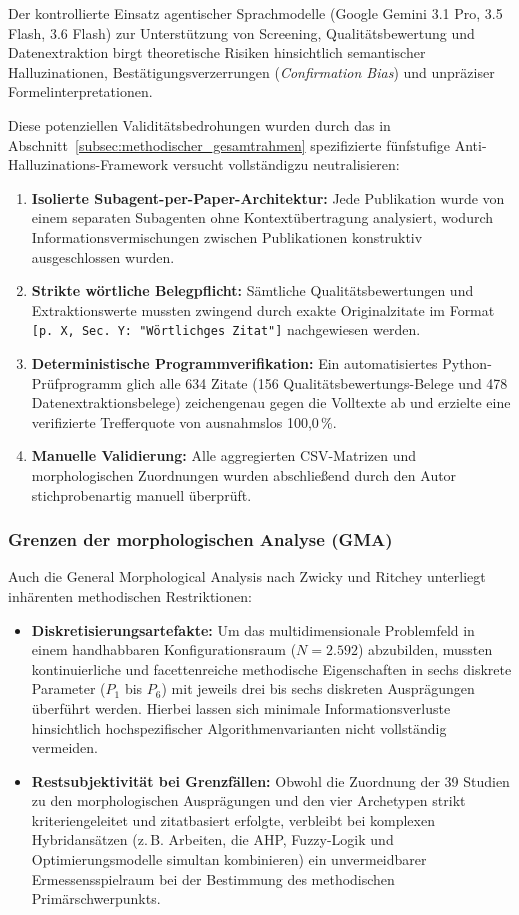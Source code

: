 Der kontrollierte Einsatz agentischer Sprachmodelle (Google Gemini 3.1 Pro, 3.5 Flash, 3.6 Flash) zur Unterstützung von Screening, Qualitätsbewertung und Datenextraktion birgt theoretische Risiken hinsichtlich semantischer Halluzinationen, Bestätigungs\-verzerrungen (\textit{Confirmation Bias}) und unpräziser Formelinterpretationen.

Diese potenziellen Validitätsbedrohungen wurden durch das in Abschnitt~\ref{subsec:methodischer_gesamtrahmen} spezifizierte fünfstufige Anti-Halluzinations-Framework versucht vollständigzu neutralisieren:
\begin{enumerate}[label=(\alph*), leftmargin=*]
  \item \textbf{Isolierte Subagent-per-Paper-Architektur:} Jede Publikation wurde von einem separaten Subagenten ohne Kontextübertragung analysiert, wodurch Informationsvermischungen zwischen Publikationen konstruktiv ausgeschlossen wurden.
  \item \textbf{Strikte wörtliche Belegpflicht:} Sämtliche Qualitätsbewertungen und Extraktionswerte mussten zwingend durch exakte Originalzitate im Format \texttt{[p.~X, Sec.~Y: "Wörtlichges Zitat"]} nachgewiesen werden.
  \item \textbf{Deterministische Programmverifikation:} Ein automatisiertes Python-Prüfprogramm glich alle 634 Zitate (156 Qualitätsbewertungs-Belege und 478 Datenextraktionsbelege) zeichengenau gegen die Volltexte ab und erzielte eine verifizierte Trefferquote von ausnahmslos 100,0\,\%.
  \item \textbf{Manuelle Validierung:} Alle aggregierten CSV-Matrizen und morphologischen Zuordnungen wurden abschließend durch den Autor stichprobenartig manuell überprüft.
\end{enumerate}

\subsubsection{Grenzen der morphologischen Analyse (GMA)}
\label{subsubsec:grenzen_gma}

Auch die General Morphological Analysis nach Zwicky und Ritchey \parencite{Z6N6V5L9} unterliegt inhärenten methodischen Restriktionen:
\begin{itemize}[leftmargin=*]
  \item \textbf{Diskretisierungsartefakte:} Um das multidimensionale Problemfeld in einem handhabbaren Konfigurationsraum ($N = 2.592$) abzubilden, mussten kontinuierliche und facettenreiche methodische Eigenschaften in sechs diskrete Parameter ($P_1$ bis $P_6$) mit jeweils drei bis sechs diskreten Ausprägungen überführt werden. Hierbei lassen sich minimale Informationsverluste hinsichtlich hochspezifischer Algorithmenvarianten nicht vollständig vermeiden.
  \item \textbf{Restsubjektivität bei Grenzfällen:} Obwohl die Zuordnung der 39 Studien zu den morphologischen Ausprägungen und den vier Archetypen strikt kriteriengeleitet und zitatbasiert erfolgte, verbleibt bei komplexen Hybridansätzen (z.\,B. Arbeiten, die AHP, Fuzzy-Logik und Optimierungsmodelle simultan kombinieren) ein unvermeidbarer Ermessensspielraum bei der Bestimmung des methodischen Primärschwerpunkts.
\end{itemize}

